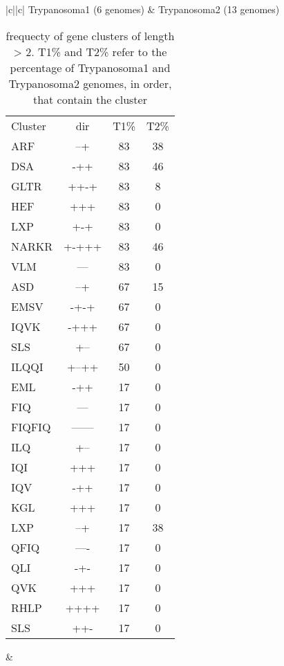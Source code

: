 \documentclass[table,
12pt, %
a4paper, %
oneside, %
headinclude,footinclude, %
BCOR5mm, %
]{scrartcl}
\begin{document}
\begin{table}[htbp]
\caption{frequecty of gene clusters of length > 2. T1\% and T2\% refer to the percentage of Trypanosoma1 and Trypanosoma2 genomes, in order, that contain the cluster}
\begin{adjustbox}{center}
\begin{tabular}{|c||c|} \hline
Trypanosoma1 (6 genomes) & Trypanosoma2 (13 genomes) \\ \hline\hline
\begin{tabular}{l ccc}
Cluster&dir& T1\%&T2\%\\
ARF&--+&83&38\\
DSA&-++&83&46\\
GLTR&++-+&83&8\\
HEF&+++&83&0\\
LXP&+-+&83&0\\
NARKR&+-+++&83&46\\
VLM&---&83&0\\
ASD&--+&67&15\\
EMSV&-+-+&67&0\\
IQVK&-+++&67&0\\
SLS&+--&67&0\\
ILQQI&+--++&50&0\\
EML&-++&17&0\\
FIQ&---&17&0\\
FIQFIQ&------&17&0\\
ILQ&+--&17&0\\
IQI&+++&17&0\\
IQV&-++&17&0\\
KGL&+++&17&0\\
LXP&--+&17&38\\
QFIQ&----&17&0\\
QLI&-+-&17&0\\
QVK&+++&17&0\\
RHLP&++++&17&0\\
SLS&++-&17&0\\
\end{tabular} &


\end{tabular}
\end{adjustbox}
\end{table}
\end{document}
